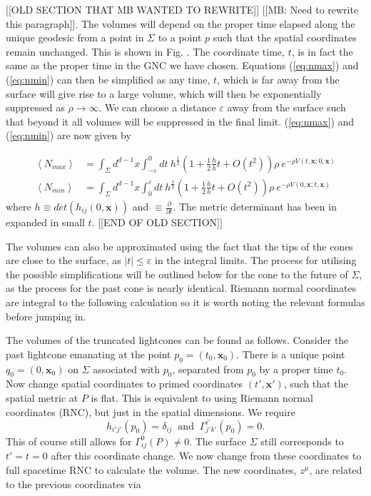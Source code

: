 \documentclass[12pt]{article}
\newcommand{\be}{\begin{equation}}
\newcommand{\ee}{\end{equation}}
\begin{document}
[[OLD SECTION THAT MB WANTED TO REWRITE]]
[[MB: Need to rewrite this paragraph]]. 
The volumes will depend on the proper time elapsed along the unique geodesic from a point in $\Sigma$ to a point $p$ such that the spatial coordinates remain unchanged. This is shown in Fig. . The coordinate time, $t$, is in fact the same as the proper time in the GNC we have chosen. Equations (\ref{eq:nmax}) and (\ref{eq:nmin}) can then be simplified as any time, $t$, which is far away from the surface will give rise to a large volume, which will then be exponentially suppressed as $\rho \rightarrow \infty$. We can choose a distance $\varepsilon$ away from the surface such that beyond it all volumes will be suppressed in the final limit. (\ref{eq:nmax}) and (\ref{eq:nmin}) are now given by

\begin{align}
\left\langle N_{max}\right\rangle & =\int_{\Sigma}d^{d-1}x\int_{-\varepsilon}^{0}dt\:
h^{\frac{1}{2}}\left(1+
\frac{1}{2}\frac{\dot{h}}{h}t+O(t^2)\right)
 \rho\ e^{-\rho V(t,\mathbf{x};0,\mathbf{x})}
\\
\left\langle N_{min}\right\rangle & =\int_{\Sigma}d^{d-1}x\int_{0}^{\varepsilon}dt\:
h^{\frac{1}{2}}\left(1+
\frac{1}{2}\frac{\dot{h}}{h}t+O(t^2)\right) \rho\ e^{-\rho V(0,\mathbf{x};t,\mathbf{x})}
\end{align}
where $h\equiv det\left(h_{ij}(0,\mathbf{x})\right)$ and $\dot{}\equiv \frac{\partial}{\partial t}$. The metric determinant has been in expanded in small $t$.
[[END OF OLD SECTION]]

The volumes can also be approximated using the fact that the tips of the cones are close to the surface, as $|t|\leq\varepsilon$ in the integral limits. The process for utilising the possible simplifications will be outlined below for the cone to the future of $\Sigma$, as the process for the past cone is nearly identical. Riemann normal coordinates are integral to the following calculation so it is worth noting the relevant formulas before jumping in. 



The volumes of the truncated lightcones can be found as follows. Consider the past lightcone emanating at the point $p_0=(t_0,\mathbf x_0)$. There is a unique point $q_0=(0,\mathbf x_0)$ on $\Sigma$ associated with $p_0$, separated from $p_0$ by a proper time $t_0$. Now change  spatial coordinates to primed coordinates $(t',\mathbf{x} ')$, such that the spatial metric at $P$ is flat. This is equivalent to using Riemann normal coordinates (RNC), but just in the spatial dimensions. We require
\be\label{metric_flat_conditions}
h_{i'j'}(p_0)=\delta_{ij}  \;\;\text{and}\;\; \Gamma^{i'}_{j'k'}(p_0)=0.
\ee
This of course still allows for $\Gamma^{0}_{ij}(P)\neq0$. The surface $\Sigma$ still corresponds to $t'=t=0$ after this coordinate change. We now change from these coordinates to full spacetime RNC to calculate the volume. The new coordinates, $z^\mu$, are related to the previous coordinates via
\end{document}
